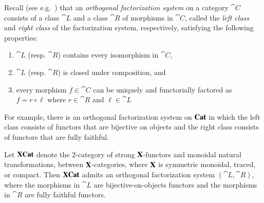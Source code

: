 \documentclass[12pt,oneside,article,draft]{memoir}
\begin{document}
Recall (see e.g.~\cite{AdamekHerrlichStrecker}) that an \emph{orthogonal factorization system} on a category $\cat{C}$ consists of a class $\cat{L}$ and a class $\cat{R}$ of morphisms in $\cat{C}$, called the \emph{left class} and \emph{right class} of the factorization system, respectively, satisfying the following properties:
\begin{enumerate}
\item $\cat{L}$ (resp. $\cat{R}$) contains every isomorphism in $\cat{C}$, 
\item $\cat{L}$ (resp. $\cat{R}$) is closed under composition, and
\item every morphism $f\in\cat{C}$ can be uniquely and functorially factored as $f=r\circ\ell$ where $r\in\cat{R}$ and $\ell\in\cat{L}$
\end{enumerate}
For example, there is an orthogonal factorization system on $\mathbf{Cat}$ in which the left class consists of functors that are bijective on objects and the right class consists of functors that are fully faithful. 


\begin{lemma}\label{lemma:factorization system}

Let $\mathbf{XCat}$ denote the 2-category of strong $\mathbf{X}$-functors and monoidal natural transformations, between $\mathbf{X}$-categories, where $\mathbf{X}$ is symmetric monoidal, traced, or compact. Then $\mathbf{XCat}$ admits an orthogonal factorization system $(\cat{L},\cat{R})$, where the morphisms in $\cat{L}$ are bijective-on-objects functors and the morphisms in $\cat{R}$ are fully faithful functors.

\end{lemma}
\end{document}

